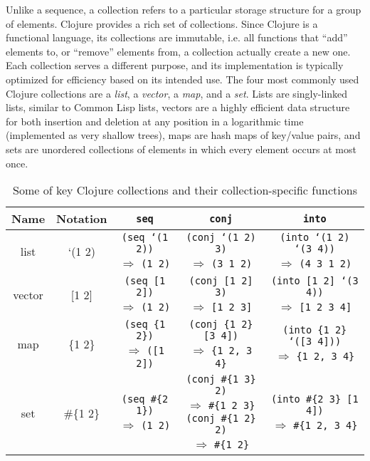 \documentclass[submission,copyright,creativecommons]{eptcs}
\begin{document}
Unlike a sequence, a collection refers to a particular storage structure for a group of elements. Clojure provides a rich set of collections. Since Clojure is a functional language, its collections are immutable, i.e. all functions that ``add'' elements to,  or ``remove'' elements from, a collection actually create a new one. Each collection serves a different purpose, and its  implementation  is typically optimized for efficiency based on its intended use. The four most commonly used Clojure collections are a {\it list}, a {\it vector}, a {\it map}, and a {\it set}. Lists are singly-linked lists, similar to Common Lisp lists, vectors are a highly efficient data structure for both insertion and deletion at any position in a logarithmic time (implemented as very shallow trees), maps are hash maps of key/value pairs, and sets are unordered collections of elements in which every element occurs at most once. 

\begin{table}[t]
\centering
\begin{tabular}{|c|c|c|c|c|}
\hline
Name & Notation & {\tt seq} & {\tt conj} &  {\tt into}  \\
\hline
list & `(1 2) & {\parbox{3cm}{{\tt (seq `(1 2))} \\ $\Rightarrow$ {\tt (1 2)}}} &
{\parbox{3.5cm}{{\tt (conj `(1 2) 3)} \\ $\Rightarrow$ {\tt (3 1 2)}}} & 
{\parbox{4.2cm}{{\tt (into `(1 2) `(3 4))} \\ $\Rightarrow$ {\tt (4 3 1 2)}}} 
\\
\hline
vector & [1 2] & 
{\parbox{3cm}{{\tt (seq [1 2])} \\ $\Rightarrow$ {\tt (1 2)}}} &
{\parbox{3.5cm}{{\tt (conj [1 2] 3)} \\ $\Rightarrow$ {\tt [1 2 3]}}} & 
{\parbox{4.2cm}{{\tt (into [1 2] `(3 4))} \\ $\Rightarrow$ {\tt [1 2 3 4]}}} 
 \\
\hline
map & \{1 2\} & 
{\parbox{3cm}{{\tt (seq \{1 2\})} \\ $\Rightarrow$ {\tt ([1 2])}}} &
{\parbox{3.5cm}{{\tt (conj \{1 2\} [3 4])} \\ $\Rightarrow$ {\tt \{1 2, 3 4\}}}} & 
{\parbox{4.2cm}{{\tt (into \{1 2\} `([3 4]))} \\ $\Rightarrow$ {\tt \{1 2, 3 4\}}}} 
 \\
\hline
set & \#\{1 2\} & 
{\parbox{3cm}{{\tt (seq \#\{2 1\})} \\ $\Rightarrow$ {\tt (1 2)}}} &
{\parbox{3.5cm}{{\tt (conj \#\{1 3\} 2)} \\ $\Rightarrow$ {\tt \#\{1 2 3\}}
\\ {\tt (conj \#\{1 2\} 2)} \\ $\Rightarrow$ {\tt \#\{1 2\}}}} & 
{\parbox{4.2cm}{{\tt (into \#\{2 3\} [1 4])} \\ $\Rightarrow$ {\tt \#\{1 2, 3 4\}}}} 
 \\
\hline
\end{tabular}
\caption{Some of key Clojure collections and their collection-specific functions}\label{table:coll}
\end{table}
\end{document}
